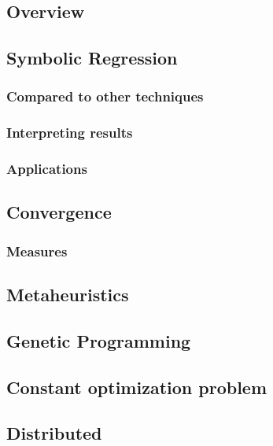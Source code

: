 \subsection{Overview}

\subsection{Symbolic Regression}

\subsubsection{Compared to other techniques}

\subsubsection{Interpreting results}
%

\subsubsection{Applications}

\subsection{Convergence}
\subsubsection{Measures}

\subsection{Metaheuristics}

\subsection{Genetic Programming}

\subsection{Constant optimization problem}

\subsection{Distributed}
